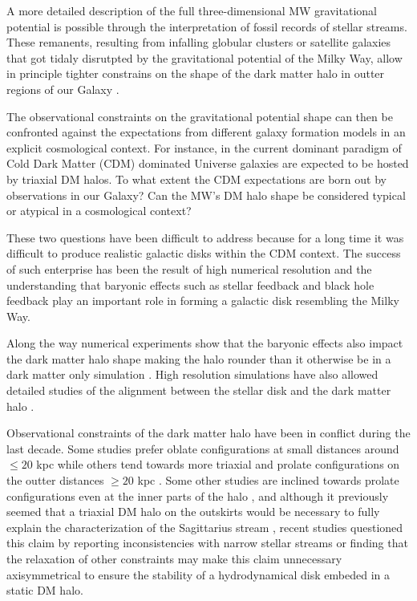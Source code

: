\documentclass[a4paper,fleqn,usenatbib]{mnras}
\begin{document}
A more detailed description of the full three-dimensional MW
gravitational potential is possible through the interpretation of 
fossil records of stellar streams.
These remanents, resulting from infalling globular clusters or
satellite galaxies that got tidaly disrutpted by the gravitational
potential of the Milky Way, allow in principle tighter constrains 
on the shape of the dark matter halo in outter regions of our Galaxy
\citep{1998ApJ...495..297J,1999MNRAS.307..495H, 1999MNRAS.307..877T}.  

The observational constraints on the gravitational potential shape can then
be confronted against the expectations from different galaxy formation
models in an explicit cosmological context.
For instance, in the current dominant paradigm of Cold Dark Matter
(CDM) dominated Universe galaxies are expected to be hosted by
triaxial DM halos. To what extent the CDM expectations are born out by
observations in our Galaxy? Can the MW's DM halo shape be considered
typical or atypical in a cosmological context?

These two questions have been difficult to address because for a long
time it was difficult to produce realistic galactic disks within the
CDM context.
The success of such enterprise has been the result of high numerical
resolution and the understanding that baryonic effects such as stellar
feedback and black hole feedback play an important role in forming a
galactic disk resembling the Milky Way.

Along the way numerical experiments show that the baryonic effects also impact
the dark matter halo shape making the halo rounder than it otherwise
be in a dark matter only simulation
\citep{Dubinski94,Debattista08,Kazantzidis10,Abadi10,Bryan13,Chua19,Artale19}. 
High resolution simulations have also allowed detailed studies of the
alignment between the stellar disk and the dark matter halo
\cite{Bailin05,DeBuhr12,Debattista13,Gomez17}.


Observational constraints of the dark matter halo have been in
conflict during the last decade.
Some studies prefer oblate configurations at small
distances around $\leq 20$ kpc
\citep{LM10,Bovy16,Loebman_et_al._2012,Olling_and_Merrifield_2000,Banerjee_and_Chanda_2011} 
while others tend towards more triaxial and prolate configurations on
the outter distances $\geq 20$ kpc
\citep{Vera-Ciro_and_Helmi_2013,Law_and_Majewski_2009,Banerjee_and_Chanda_2011,Deg_and_Widrow_2013}. 
Some other studies are inclined towards prolate configurations even at the inner
parts of the halo \citep{Bowden_et_al._2016}, and
although it previously seemed that a triaxial DM halo on the
outskirts would be necessary to fully explain the characterization
of the Sagittarius stream \citep{Law_and_Majewski_2009}, recent studies
questioned this claim by reporting inconsistencies with narrow stellar
streams \citet{Pearson_et_al._2015} or finding that
the relaxation of other constraints may make this claim unnecessary
\citet{Ibata_et_al._2013} axisymmetrical to ensure the stability of
a hydrodynamical disk embeded in a static DM halo. 
\end{document}
